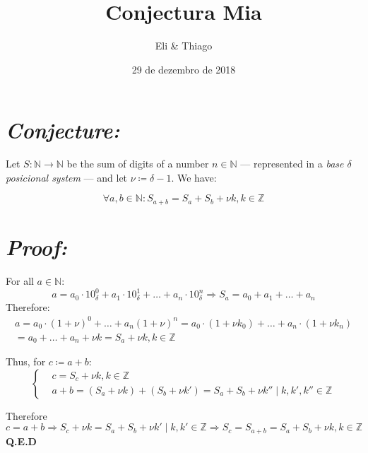 \documentclass{article}
\title{Conjectura Mia}
\author{Eli \& Thiago}
\date{29 de dezembro de 2018}
\begin{document}
	\maketitle
	\section*{\textit{Conjecture:}}
		Let $S:\mathbb{N} \rightarrow \mathbb{N}$ be the sum of digits of a number $n \in \mathbb{N}$ --- represented in a \textit{base $\delta$ posicional system} --- and let $\nu \coloneqq \delta - 1$. We have:
		
		$$
		\forall a, b \in \mathbb{N} : S_{a+b}=S_a + S_b + \nu k, k \in \mathbb{Z}
		$$

	\section*{\textit{Proof:}}
		For all $a \in \mathbb{N}$:
		$$
		a = a_0 \cdot 10_\delta^0 + a_1 \cdot 10_\delta^1 + \dots + a_n \cdot 10_\delta^n \Rightarrow S_a = a_0 + a_1 + \dots + a_n
		$$
		\noindent Therefore:
		$$
		\begin{matrix}
		a = a_0 \cdot (1 + \nu)^0 + \dots + a_n (1 + \nu)^n = a_0 \cdot (1 + \nu k_0) + \dots + a_n \cdot (1 + \nu k_n) \\ = a_0 + \dots + a_n + \nu k = S_a + \nu k, k \in \mathbb{Z}
		\end{matrix}
		$$
		
		\noindent Thus, for $c \coloneqq a + b$:
		$$
		\begin{cases}
		& c = S_c + \nu k, k \in \mathbb{Z} \\
		& a + b = (S_a + \nu k) + (S_b + \nu k') = S_a + S_b + \nu k''\;|\; k, k', k''\in \mathbb{Z}
		\end{cases}
		$$
		
		Therefore $c = a + b \Rightarrow S_c + \nu k = S_a + S_b + \nu k'\;|\; k, k'\in \mathbb{Z} \Rightarrow S_c = S_{a + b} = S_a + S_b + \nu k, k \in \mathbb{Z}$
		\noindent \textbf{Q.E.D}
\end{document}
